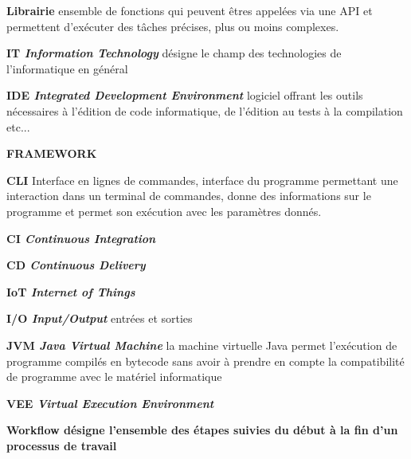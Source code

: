 \documentclass[french,a4paper,12pt]{report}
\begin{document}
\bigskip

\hypertarget{Librairie}{\noindent\textbf{Librairie} ensemble de fonctions qui peuvent êtres appelées via une API et permettent d'exécuter des tâches précises, plus ou moins complexes.}

\bigskip

\hypertarget{IT}{\noindent\textbf{IT \emph{Information Technology}} désigne le champ des technologies de  l'informatique en général}

\bigskip

\hypertarget{IDE}{\noindent\textbf{IDE \emph{Integrated Development Environment}} logiciel offrant les outils nécessaires à l'édition de code informatique, de l'édition au tests à la compilation etc...}

\bigskip

\hypertarget{FRAMEWORK}{\noindent\textbf{FRAMEWORK} }

\bigskip

\hypertarget{CLI}{\noindent\textbf{CLI} Interface en lignes de commandes, interface du programme permettant une interaction dans un terminal de commandes, donne des informations sur le programme et permet son exécution avec les paramètres donnés. }

\bigskip

\hypertarget{CI}{\noindent\textbf{CI \emph{Continuous Integration}}}

\bigskip

\hypertarget{CD}{\noindent\textbf{CD \emph{Continuous Delivery}}} 

\bigskip

\hypertarget{IoT}{\noindent\textbf{IoT \emph{Internet of Things}}} 

\bigskip

\hypertarget{IO}{\noindent\textbf{I/O \emph{Input/Output}} entrées et sorties}

\bigskip

\hypertarget{JVM}{\noindent\textbf{JVM \emph{Java Virtual Machine}} la machine virtuelle Java permet l’exécution de programme compilés en bytecode sans avoir à prendre en compte la compatibilité de programme avec le matériel informatique }

\bigskip

\hypertarget{VEE}{\noindent\textbf{VEE \emph{Virtual Execution Environment}}}

\hypertarget{Workflow}{\noindent\textbf{Workflow désigne l'ensemble des étapes suivies du début à la fin d'un processus de travail}}
\end{document}
